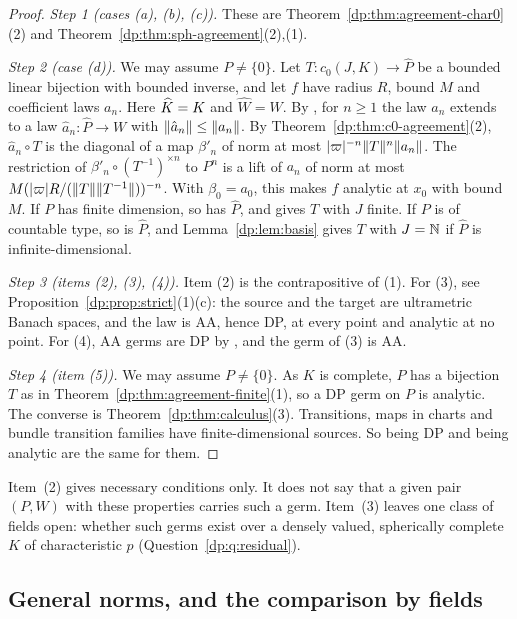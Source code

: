 \begin{proof}
\emph{Step 1 (cases (a), (b), (c)).} These are Theorem~\ref{dp:thm:agreement-char0}(2) and Theorem~\ref{dp:thm:sph-agreement}(2),(1).

\emph{Step 2 (case (d)).} We may assume $P\ne\{0\}$. Let $T\colon c_0(J,K)\to\widehat P$ be a bounded linear bijection with bounded inverse, and let $f$ have radius $R$, bound $M$ and coefficient laws $a_n$. Here $\widehat K=K$ and $\widehat W=W$. By \cite[Lemma~Q.13(1)]{I}, for $n\ge1$ the law $a_n$ extends to a law $\hat a_n\colon\widehat P\to W$ with $\lVert \hat a_n\rVert\le\lVert a_n\rVert$. By Theorem~\ref{dp:thm:c0-agreement}(2), $\hat a_n\circ T$ is the diagonal of a map $\beta'_n$ of norm at most $\lvert \varpi\rvert^{-n}\lVert T\rVert^n\lVert a_n\rVert$. The restriction of $\beta'_n\circ(T^{-1})^{\times n}$ to $P^n$ is a lift of $a_n$ of norm at most $M(\lvert \varpi\rvert R/(\lVert T\rVert\lVert T^{-1}\rVert))^{-n}$. With $\beta_0=a_0$, this makes $f$ analytic at $x_0$ with bound $M$. If $P$ has finite dimension, so has $\widehat P$, and \cite[Lemma~A.3]{I} gives $T$ with $J$ finite. If $P$ is of countable type, so is $\widehat P$, and Lemma~\ref{dp:lem:basis} gives $T$ with $J=\mathbb N$ if $\widehat P$ is infinite-dimensional.

\emph{Step 3 (items (2), (3), (4)).} Item (2) is the contrapositive of (1). For (3), see Proposition~\ref{dp:prop:strict}(1)(c): the source and the target are ultrametric Banach spaces, and the law is AA, hence DP, at every point and analytic at no point. For (4), AA germs are DP by \cite[Proposition~14.9(1)]{I}, and the germ of (3) is AA.

\emph{Step 4 (item (5)).} We may assume $P\ne\{0\}$. As $K$ is complete, $P$ has a bijection $T$ as in Theorem~\ref{dp:thm:agreement-finite}(1), so a DP germ on $P$ is analytic. The converse is Theorem~\ref{dp:thm:calculus}(3). Transitions, maps in charts and bundle transition families have finite-dimensional sources. So being DP and being analytic are the same for them.
\end{proof}

Item~(2) gives necessary conditions only. It does not say that a given pair $(P,W)$ with these properties carries such a germ. Item~(3) leaves one class of fields open: whether such germs exist over a densely valued, spherically complete $K$ of characteristic $p$ (Question~\ref{dp:q:residual}).

\subsection{General norms, and the comparison by fields}\label{dp:ssec:agree-general}

